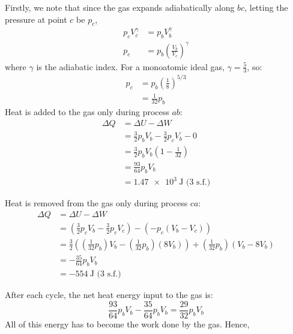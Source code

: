 \begin{solution}
    \begin{subsolution}
        Firstly, we note that since the gas expands adiabatically along $bc$, letting the pressure at point $c$ be $p_c$,
        \begin{align*}
            p_c V_c^{\gamma}&=p_b V_b^{\gamma}\\
            p_c&=p_b \left(\frac{V_b}{V_c}\right)^{\gamma}
        \end{align*}
        where $\gamma$ is the adiabatic index. For a monoatomic ideal gas, $\gamma=\frac{5}{3}$, so:
        \begin{align*}
            p_c&=p_b \left(\frac{1}{8}\right)^{5/3}\\
            &=\frac{1}{32}p_b
        \end{align*}
        Heat is added to the gas only during process $ab$:
        \begin{align*}
            \Delta Q&=\Delta U - \Delta W\\
            &=\frac{3}{2}p_b V_b - \frac{3}{2}p_c V_b - 0\\
            &=\frac{3}{2}p_b V_b\left(1-\frac{1}{32}\right)\\
            &=\frac{93}{64}p_b V_b\\
            &=\boxed{\qty{1.47e3}{\J}}\text{ (3 s.f.)}
        \end{align*}
    \end{subsolution}
    \begin{subsolution}
        Heat is removed from the gas only during process $ca$:
        \begin{align*}
            \Delta Q&=\Delta U - \Delta W\\
            &=\left(\frac{3}{2}p_cV_b-\frac{3}{2}p_cV_c\right) - \left(-p_c(V_b-V_c)\right)\\
            &=\frac{3}{2}\left(\left(\frac{1}{32}p_b\right)V_b-\left(\frac{1}{32}p_b\right)(8V_b)\right) + \left(\frac{1}{32}p_b\right)(V_b-8V_b)\\
            &=-\frac{35}{64}p_bV_b\\
            &=-\boxed{\qty{554}{\J}}\text{ (3 s.f.)}
        \end{align*}
    \end{subsolution}
    \begin{subsolution}
        After each cycle, the net heat energy input to the gas is:
        \[\frac{93}{64}p_b V_b-\frac{35}{64}p_b V_b=\frac{29}{32}p_b V_b\]
        All of this energy has to become the work done by the gas. Hence,

\end{subsolution}
\end{solution}
